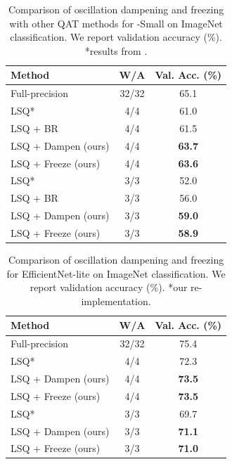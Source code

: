 \begin{table}[t]
    \centering
    \begin{tabular}{ l | c |  c }
    \toprule

  Method & W/A &    Val. Acc. (\%)  \\
        \midrule
Full-precision & 32/32 & 65.1 \\
\midrule
LSQ* \citep{lsq}         & 4/4 & 61.0  \\
LSQ + BR \citep{binreg} & 4/4 & 61.5 \\
LSQ + Dampen (ours)     & 4/4 & \textbf{63.7}  \\ 
LSQ + Freeze (ours)     & 4/4 &  \textbf{63.6} \\
\midrule
LSQ* \citep{lsq}         & 3/3 &  52.0 \\
LSQ + BR \citep{binreg} & 3/3 &   56.0 \\
LSQ + Dampen (ours)     & 3/3 &   \textbf{59.0}  \\
LSQ + Freeze (ours)     & 3/3 &   \textbf{58.9} \\
\bottomrule
\end{tabular}
 \caption{Comparison of oscillation dampening and freezing with other QAT methods for -Small on ImageNet classification. We report validation accuracy (\%). *results from \citet{binreg}.}
 \label{tbl:final_results_mnv3}
\end{table}


\begin{table}[t]
    \centering
    \begin{tabular}{ l | c |  c }
    \toprule

  Method & W/A &    Val. Acc. (\%)  \\
        \midrule
Full-precision          & 32/32 & 75.4 \\
\midrule
LSQ* \citep{lsq}         & 4/4 &  72.3 \\
LSQ + Dampen (ours)     & 4/4 &  \textbf{73.5} \\
LSQ + Freeze (ours)     & 4/4 &  \textbf{73.5} \\
\midrule
LSQ* \citep{lsq}         & 3/3 &  69.7 \\
LSQ + Dampen (ours)     & 3/3 &  \textbf{71.1}  \\
LSQ + Freeze (ours)     & 3/3 &  \textbf{71.0} \\
\bottomrule
\end{tabular}
 \caption{Comparison of oscillation dampening and freezing for EfficientNet-lite on ImageNet classification. We report validation accuracy (\%). *our re-implementation.}
 \label{tbl:final_results_en_lite}
\end{table}


